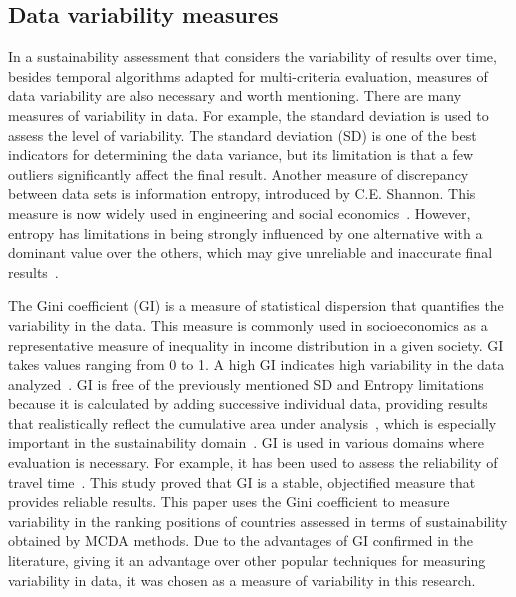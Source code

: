 \documentclass[final,5p,times,twocolumn,authoryear]{elsarticle}
\newcounter{example}[section]
\begin{document}
\subsection{Data variability measures}
\label{sec:aboutVariabilityMeasurement}
In a sustainability assessment that considers the variability of results over time, besides temporal algorithms adapted for multi-criteria evaluation, measures of data variability are also necessary and worth mentioning. There are many measures of variability in data. For example, the standard deviation is used to assess the level of variability. The standard deviation (SD) is one of the best indicators for determining the data variance, but its limitation is that a few outliers significantly affect the final result. Another measure of discrepancy between data sets is information entropy, introduced by C.E. Shannon. This measure is now widely used in engineering and social economics~\citep{li2020novel}. However, entropy has limitations in being strongly influenced by one alternative with a dominant value over the others, which may give unreliable and inaccurate final results~\citep{zavadskas2016integrated, alao2021selection}.

The Gini coefficient (GI) is a measure of statistical dispersion that quantifies the variability in the data. This measure is commonly used in socioeconomics as a representative measure of inequality in income distribution in a given society. GI takes values ranging from 0 to 1. A high GI indicates high variability in the data analyzed~\citep{lai2020sustainable}. GI is free of the previously mentioned SD and Entropy limitations because it is calculated by adding successive individual data, providing results that realistically reflect the cumulative area under analysis~\citep{biro2020gintropy}, which is especially important in the sustainability domain~\citep{long2019economic}. GI is used in various domains where evaluation is necessary. For example, it has been used to assess the reliability of travel time~\citep{lee2019gini}. This study proved that GI is a stable, objectified measure that provides reliable results. This paper uses the Gini coefficient to measure variability in the ranking positions of countries assessed in terms of sustainability obtained by MCDA methods. Due to the advantages of GI confirmed in the literature, giving it an advantage over other popular techniques for measuring variability in data, it was chosen as a measure of variability in this research.
\end{document}
